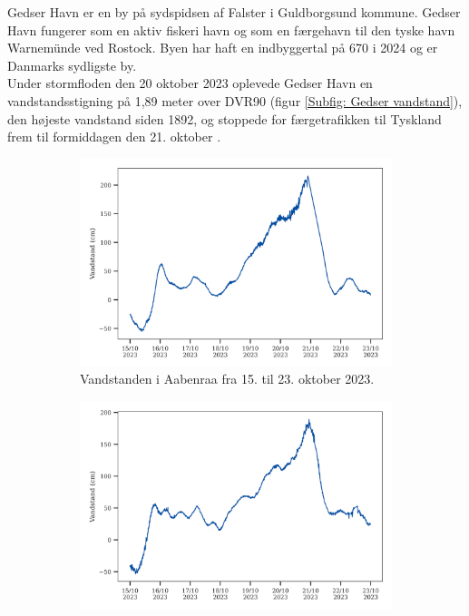 Gedser Havn er en by på sydspidsen af Falster i Guldborgsund kommune. Gedser Havn fungerer som en aktiv fiskeri havn og som en færgehavn til den tyske havn Warnemünde ved Rostock. Byen har haft en indbyggertal på 670 i 2024 \citep{danmarks_statistisk_mobile_nodate} og er Danmarks sydligste by. \\
Under stormfloden den 20 oktober 2023 oplevede Gedser Havn en vandstandsstigning på 1,89 meter over DVR90 (figur \ref{Subfig: Gedser vandstand}), den højeste vandstand siden 1892, og stoppede for færgetrafikken til Tyskland frem til formiddagen den 21. oktober \citep{tiirikainen_sadan_2023}.\\
\begin{figure}[H]
    \begin{subfigure}[b]{0.5\textwidth}
        \centering
        \includegraphics[width=1\textwidth]{images/vandstands_grafer/vandstand_aabenraa_vandstandsplot.png}
        \caption{Vandstanden i Aabenraa fra 15. til 23. oktober 2023.}
        \label{Subfig: Aabenraa vandstand}
    \end{subfigure}
    \hspace{0.2cm}
    \begin{subfigure}[b]{0.5\textwidth}
        \centering
        \includegraphics[width=1\textwidth]{images/vandstands_grafer/vandstand_gedser_vandstandsplot.png}

\end{subfigure}
\end{figure}
